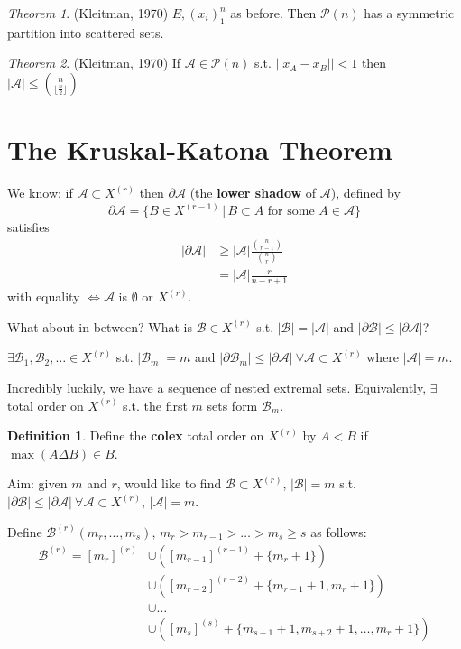 \documentclass[a4paper]{article}
\theoremstyle{definition}
\newtheorem*{definition}{Definition}
\theoremstyle{remark}
\theoremstyle{default}
\newtheorem{theorem}{Theorem}
\newcommand*\abs[1]{\left|#1\right|}
\newcommand*\norm[1]{\abs{\abs{#1}}}
\begin{document}
\begin{theorem}(Kleitman, 1970)
	$E, (x_i)_1^n$ as before. Then $\mathcal{P}(n)$ has a symmetric partition into scattered sets.
\end{theorem}

\begin{theorem}(Kleitman, 1970)
	If $\mathcal{A} \in \mathcal{P}(n)$ s.t. $\norm{x_A-x_B} < 1$ then $\abs{\mathcal{A}} \leq {n \choose {\lfloor\frac{n}{2}\rfloor}}$
\end{theorem}

\section{The Kruskal-Katona Theorem}
\setcounter{theorem}{0}
We know: if $\mathcal{A} \subset X^{(r)}$ then $\partial \mathcal{A}$ (the \textbf{lower shadow} of $\mathcal{A}$),
defined by $$\partial \mathcal{A} = \{B \in X^{(r-1)} \,|\, B \subset A \text{ for some } A \in \mathcal{A}\}$$ satisfies
\begin{align*}
\abs{\partial \mathcal{A}} &\geq \abs{\mathcal{A}} \frac{{n \choose r-1}}{{n \choose r}} \\
&= \abs{\mathcal{A}}\frac{r}{n-r+1}
\end{align*}
with equality $\iff \mathcal{A}$ is $\emptyset$ or $X^{(r)}$.

What about in between?
What is $\mathcal{B} \in X^{(r)}$ s.t. $\abs{\mathcal{B}} = \abs{\mathcal{A}}$ and $\abs{\partial\mathcal{B}} \leq \abs{\partial\mathcal{A}}$?

$\exists \mathcal{B}_1, \mathcal{B}_2, \dots \in X^{(r)}$ s.t. $\abs{\mathcal{B}_m} = m$ and $\abs{\partial \mathcal{B}_m} \leq \abs{\partial \mathcal{A}} \ \forall \mathcal{A} \subset X^{(r)}$ where $\abs{\mathcal{A}} = m$.

Incredibly luckily, we have a sequence of nested extremal sets.
Equivalently, $\exists$ total order on $X^{(r)}$ s.t. the first $m$ sets form $\mathcal{B}_m$.

\begin{definition}
	Define the \textbf{colex} total order on $X^{(r)}$ by $A<B$ if $\max(A \Delta B) \in B$.
\end{definition}

Aim: given $m$ and $r$, would like to find $\mathcal{B} \subset X^{(r)}$, $\abs{\mathcal{B}} = m$ s.t. $\abs{\partial\mathcal{B}} \leq \abs{\partial\mathcal{A}}\ \forall \mathcal{A} \subset X^{(r)}$, $\abs{\mathcal{A}} = m$.

Define $\mathcal{B}^{(r)}(m_r, \dots, m_s),\, m_r > m_{r-1} > \dots > m_s \geq s$ as follows:
\begin{align*}
\mathcal{B}^{(r)} = [m_r]^{(r)} &\cup ([m_{r-1}]^{(r-1)} + \{m_{r} + 1\}) \\
								&\cup ([m_{r-2}]^{(r-2)} + \{m_{r-1} +1, m_r + 1\}) \\
								&\cup \dots \\
								&\cup ([m_{s}]^{(s)} + \{m_{s+1} +1, m_{s+2} + 1, \dots, m_r + 1\}) \\
\end{align*}
\end{document}
